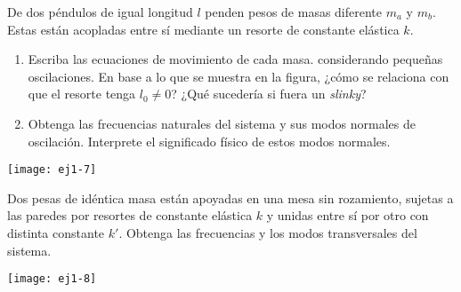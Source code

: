\item \label{pendacop}
\begin{minipage}[t][4cm]{0.75\textwidth}
De dos péndulos de igual longitud $l$ penden pesos de masas diferente $m_a$ y $m_b$.
Estas están acopladas entre sí mediante un resorte de constante elástica $k$.
\begin{enumerate}
	\item Escriba las ecuaciones de movimiento de cada masa. considerando pequeñas oscilaciones.
	En base a lo que se muestra en la figura, ¿cómo se relaciona con que el resorte tenga $l_0 \neq 0$?
	¿Qué sucedería si fuera un \emph{slinky}?   
	\item Obtenga las frecuencias naturales del sistema y sus modos normales de oscilación.
	Interprete el significado físico de estos modos normales. 
\end{enumerate}
\end{minipage}
\begin{minipage}[c][0cm][t]{0.2\textwidth}
  \texttt{[image: ej1-7]}
\end{minipage}



\item \label{2masitas}
\begin{minipage}[t][2cm]{0.65\textwidth}
Dos pesas de idéntica masa están apoyadas en una mesa sin rozamiento, sujetas a las paredes por resortes de constante
elástica $k$ y unidas entre sí por otro con distinta constante $k'$.
Obtenga las frecuencias y los modos transversales del sistema. 
\end{minipage}
\begin{minipage}[c][0.5cm][t]{0.3\textwidth}
  \texttt{[image: ej1-8]}
\end{minipage}
